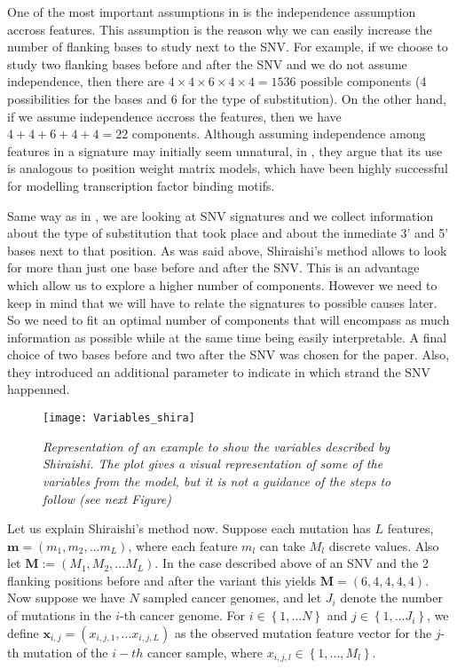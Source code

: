 \documentclass[a4paper]{article}
\begin{document}
One of the most important assumptions in \cite{Shira} is the independence assumption accross features. This assumption is the reason why we can easily increase the number of flanking bases to study next to the SNV. For example, if we choose to study two flanking bases before and after the SNV and we do not assume independence, then there are $4\times4\times6\times4\times4=1536$ possible components (4 possibilities for the bases and 6 for the type of substitution). On the other hand, if we assume independence accross the features, then we have $4+4+6+4+4=22$ components. Although assuming independence among features in a signature may initially seem unnatural, in \cite{Shira}, they argue that its use is analogous to position weight matrix models, which have been highly successful for modelling transcription factor binding motifs.

Same way as in \cite{Alex}, we are looking at SNV signatures and we collect information about the type of substitution that took place and about the inmediate 3' and 5' bases next to that position. As was said above, Shiraishi's method allows to look for more than just one base before and after the SNV. This is an advantage which allow us to explore a higher number of components. However we need to keep in mind that we will have to relate the signatures to possible causes later. So we need to fit an optimal number of components that will encompass as much information as possible while at the same time being easily interpretable. A final choice of two bases before and two after the SNV was chosen for the paper. Also, they introduced an additional parameter to indicate in which strand the SNV happenned. 

\begin{figure}[h] 
	\centering
	\texttt{[image: Variables\_shira]} 
	\caption{\textit{Representation of an example to show the variables described by Shiraishi. The plot gives a visual representation of some of the variables from the model, but it is not a guidance of the steps to follow (see next Figure)}} \label{VarShira}
\end{figure}

Let us explain Shiraishi's method now. Suppose each mutation has $L$ features, $\textbf{m}=\left(m_1,m_2,...m_L\right) $, where each feature $m_l$ can take $M_l$ discrete values. Also let $\textbf{M}:=\left(M_1, M_2, ... M_L\right)$. In the case described above of an SNV and the 2 flanking positions before and after the variant this yields $\textbf{M}=\left(6,4,4,4,4\right)$. Now suppose we have $N$ sampled cancer genomes, and let $J_i$ denote the number of mutations in the $i$-th cancer genome. For $i\in \left\{1,...N\right\}$  and $j\in \left\{1,...J_i\right\}$, we define $\textbf{x}_{i,j}=(x_{i,j,1},...x_{i,j,L})$ as the observed mutation feature vector for the $j$-th mutation of the $i-th$ cancer sample, where $x_{i,j,l}\in \left\{1,...,M_l\right\}$. 
\end{document}

